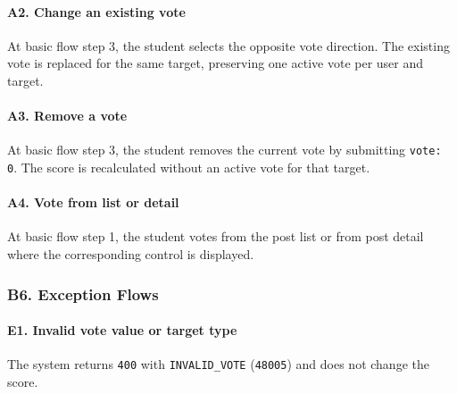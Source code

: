 \documentclass[12pt]{article}
\begin{document}
\hypertarget{sec:a2-change-an-existing-vote}{}
\paragraph*{A2. Change an existing vote}
\par\medskip

At basic flow step 3, the student selects the opposite vote direction. The existing vote is replaced for the same target, preserving one active vote per user and target.
\par\medskip

\hypertarget{sec:a3-remove-a-vote}{}
\paragraph*{A3. Remove a vote}
\par\medskip

At basic flow step 3, the student removes the current vote by submitting \texttt{vote: 0}. The score is recalculated without an active vote for that target.
\par\medskip

\hypertarget{sec:a4-vote-from-list-or-detail}{}
\paragraph*{A4. Vote from list or detail}
\par\medskip

At basic flow step 1, the student votes from the post list or from post detail where the corresponding control is displayed.
\par\medskip

\hypertarget{sec:b6-exception-flows}{}
\subsubsection*{B6. Exception Flows}
\par\medskip

\hypertarget{sec:e1-invalid-vote-value-or-target-type}{}
\paragraph*{E1. Invalid vote value or target type}
\par\medskip

The system returns \texttt{400} with \texttt{INVALID\_VOTE} (\texttt{48005}) and does not change the score.
\par\medskip
\end{document}
